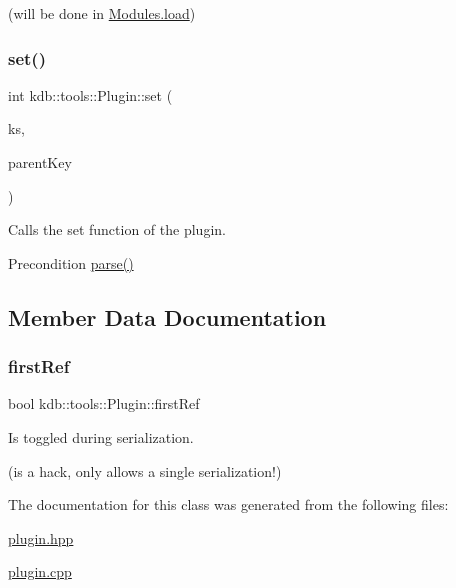 (will be done in \hyperlink{classkdb_1_1tools_1_1Modules_ae8d8c91745c9f517e6e8a556f1664f69}{Modules.\+load}) \mbox{\label{classkdb_1_1tools_1_1Plugin_abf84d512b48f6fa1b89636217537cde0}} 
\subsubsection{\texorpdfstring{set()}{set()}}
{\footnotesize\ttfamily int kdb\+::tools\+::\+Plugin\+::set (\begin{DoxyParamCaption}\item[{\hyperlink{classkdb_1_1KeySet}{kdb\+::\+Key\+Set} \&}]{ks,  }\item[{\hyperlink{classkdb_1_1Key}{kdb\+::\+Key} \&}]{parent\+Key }\end{DoxyParamCaption})}



Calls the set function of the plugin. 

\begin{DoxyPrecond}{Precondition}
\hyperlink{classkdb_1_1tools_1_1Plugin_adfcba2fbdeb436a1083410df804d5fb0}{parse()} 
\end{DoxyPrecond}


\subsection{Member Data Documentation}
\mbox{\label{classkdb_1_1tools_1_1Plugin_aee8ae2b5708c74d4ccdc1bf9e8794636}} 
\subsubsection{\texorpdfstring{first\+Ref}{firstRef}}
{\footnotesize\ttfamily bool kdb\+::tools\+::\+Plugin\+::first\+Ref}



Is toggled during serialization. 

(is a hack, only allows a single serialization!) 

The documentation for this class was generated from the following files\+:\begin{DoxyCompactItemize}
\item 
\hyperlink{plugin_8hpp}{plugin.\+hpp}\item 
\hyperlink{plugin_8cpp}{plugin.\+cpp}\end{DoxyCompactItemize}
